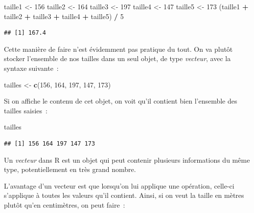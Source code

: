 \documentclass[
  12pt,
]{book}
\newenvironment{Shaded}{\begin{snugshade}}{\end{snugshade}}
\newcommand{\DecValTok}[1]{\textcolor[rgb]{0.00,0.00,0.81}{#1}}
\newcommand{\KeywordTok}[1]{\textcolor[rgb]{0.13,0.29,0.53}{\textbf{#1}}}
\newcommand{\NormalTok}[1]{#1}
\newcommand{\OperatorTok}[1]{\textcolor[rgb]{0.81,0.36,0.00}{\textbf{#1}}}
\newcommand{\StringTok}[1]{\textcolor[rgb]{0.31,0.60,0.02}{#1}}
\begin{document}
\begin{Shaded}
\begin{Highlighting}[]
\NormalTok{taille1 \textless{}{-}}\StringTok{ }\DecValTok{156}
\NormalTok{taille2 \textless{}{-}}\StringTok{ }\DecValTok{164}
\NormalTok{taille3 \textless{}{-}}\StringTok{ }\DecValTok{197}
\NormalTok{taille4 \textless{}{-}}\StringTok{ }\DecValTok{147}
\NormalTok{taille5 \textless{}{-}}\StringTok{ }\DecValTok{173}
\NormalTok{(taille1 }\OperatorTok{+}\StringTok{ }\NormalTok{taille2 }\OperatorTok{+}\StringTok{ }\NormalTok{taille3 }\OperatorTok{+}\StringTok{ }\NormalTok{taille4 }\OperatorTok{+}\StringTok{ }\NormalTok{taille5) }\OperatorTok{/}\StringTok{ }\DecValTok{5}
\end{Highlighting}
\end{Shaded}

\begin{verbatim}
## [1] 167.4
\end{verbatim}

Cette manière de faire n'est évidemment pas pratique du tout. On va plutôt stocker l'ensemble de nos tailles dans un seul objet, de type \emph{vecteur}, avec la syntaxe suivante~:

\begin{Shaded}
\begin{Highlighting}[]
\NormalTok{tailles \textless{}{-}}\StringTok{ }\KeywordTok{c}\NormalTok{(}\DecValTok{156}\NormalTok{, }\DecValTok{164}\NormalTok{, }\DecValTok{197}\NormalTok{, }\DecValTok{147}\NormalTok{, }\DecValTok{173}\NormalTok{)}
\end{Highlighting}
\end{Shaded}

Si on affiche le contenu de cet objet, on voit qu'il contient bien l'ensemble des tailles saisies~:

\begin{Shaded}
\begin{Highlighting}[]
\NormalTok{tailles}
\end{Highlighting}
\end{Shaded}

\begin{verbatim}
## [1] 156 164 197 147 173
\end{verbatim}

Un \emph{vecteur} dans R est un objet qui peut contenir plusieurs informations du même type, potentiellement en très grand nombre.

L'avantage d'un vecteur est que lorsqu'on lui applique une opération, celle-ci s'applique à toutes les valeurs qu'il contient. Ainsi, si on veut la taille en mètres plutôt qu'en centimètres, on peut faire~:
\end{document}
